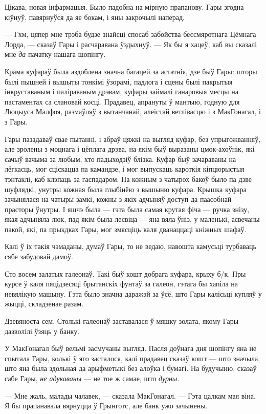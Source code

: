 Цікава, новая інфармацыя. Было падобна на мірную прапанову. Гары згодна кіўнуў, 
павярнуўся да яе бокам, і яны закрочылі наперад.

--- Гхм, цяпер мне трэба будзе знайсці спосаб забойства бессмяротнага Цёмнага
Лорда, --- сказаў Гары і расчаравана ўздыхнуў. --- Як бы я хацеў, каб вы сказалі
мне \emph{да} пачатку нашага шопінгу.

\later

Крама куфараў была аздоблена значна багацей за астатнія, дзе быў Гары: шторы 
былі пышней і вышыты тонкімі ўзорамі, падлога і сцены былі пакрытыя інкруставаным
і паліраваным дрэвам, куфары займалі ганаровыя месцы на пастаментах са слановай
косці. Прадавец, апрануты ў мантыю, годную для Люцыуса Малфоя, размаўляў
з вытанчанай, алеістай ветлівасцю і з МакГонагал, і з Гары.

Гары пазадаваў свае пытанні, і абраў цяжкі на выгляд куфар, без упрыгожванняў,
але зролены з моцнага і цёплага дрэва, на якім быў выразаны цмок-ахоўнік, які 
сачыў вачыма за любым, хто падыходзіў блізка. Куфар быў зачараваны на лёгкасць,
мог сціскацца па камандзе, і мог выпускаць кароткія кіпцюрыстыя тэнтаклі, каб
клэпаць за гаспадаром. На кожным з чатырох бакоў было па дзве шуфлядкі, 
унутры кожная была глыбінёю з вышыню куфара. Крышка куфара зачынялася на чатыры замкі,
кожны з якіх адчыняў доступ да паасобнай прасторы ўнутры. І яшчэ была --- гэта 
была самая крутая фіча --- ручка знізу, якая адчыняла люк, пад якім была
лесвіца --- яна вяла ўніз, у маленькі, асвечаны пакой, які, па прыкдках Гары,
мог змясціць каля дванаццаці кніжных шафаў.   

Калі ў іх такія чэмаданы, думаў Гары, то не ведаю, навошта камусьці турбаваць
сябе забудовай дамоў.

Сто восем залатых галеонаў. Такі быў кошт добрага куфара, крыху б/к. Пры курсе ў
каля пяцідзесяці брытанскіх фунтаў за галеон, гэтага бы хапіла на невялікую машыну.
Гэта было значна даражэй за ўсё, што Гары калісьці купляў у жыцці, складзенае 
разам.

Дзевяноста сем. Столькі галеонаў заставалася ў мяшку золата, якому Гары дазволілі
ўзяць у банку.

У МакГонагал быў вельмі засмучаны выгляд. Пасля доўнага дня шопінгу яна не спытала
Гары, колькі ў яго засталося, калі прадавец сказаў кошт --- што значыла, што яна
была здольная да арыфметыкі без алоўка і бумагі. На будучыню, сказаў сабе Гары, 
\emph{не адукаваны} --- не тое ж самае, што \emph{дурны.}

--- Мне жаль, малады чалавек, --- сказала МакГонагал. --- Гэта цалкам мая віна.
Я бы прапанавала вярнуцца ў Грынготс, але банк ужо зачынены.


